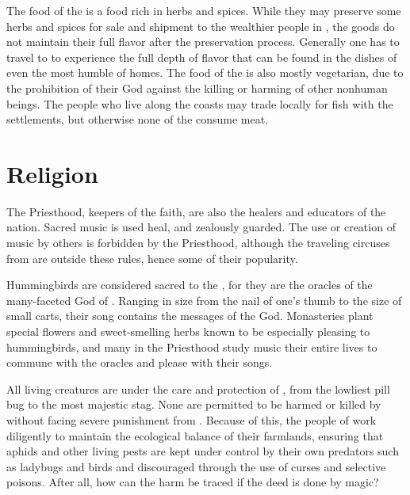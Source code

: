 \documentclass[blue]{GL2020}
\begin{document}
The food of the \pFarm{} is a food rich in herbs and spices.  While they may preserve some herbs and spices for sale and shipment to the wealthier people in \pTech{}, the goods do not maintain their full flavor after the preservation process.  Generally one has to travel to \pFarm{} to experience the full depth of flavor that can be found in the dishes of even the most humble of homes.  The food of the \pFarmers{} is also mostly vegetarian, due to the prohibition of their God against the killing or harming of other nonhuman beings.  The people who live along the coasts may trade locally for fish with the \pShip{} settlements, but otherwise none of the \pFarm{} consume meat.


\section*{Religion}

The Priesthood, keepers of the faith, are also the healers and educators of the nation.  Sacred music is used heal, and zealously guarded.  The use or creation of music by others is forbidden by the Priesthood, although the traveling circuses from \pTech{} are outside these rules, hence some of their popularity.

Hummingbirds are considered sacred to the \pFarmers{}, for they are the oracles of the many-faceted God of \pFarm{}.  Ranging in size from the nail of one's thumb to the size of small carts, their song contains the messages of the God.  Monasteries plant special flowers and sweet-smelling herbs known to be especially pleasing to hummingbirds, and many in the Priesthood study music their entire lives to commune with the oracles and please \cFarmGod{} with their songs.

All living creatures are under the care and protection of \cFarmGod{}, from the lowliest pill bug to the most majestic stag.  None are permitted to be harmed or killed by \pFarm{} without facing severe punishment from \cFarmGod{}.  Because of this, the people of \pFarm{} work diligently to maintain the ecological balance of their farmlands, ensuring that aphids and other living pests are kept under control by their own predators such as ladybugs and birds and discouraged through the use of curses and selective poisons.  After all, how can the harm be traced if the deed is done by magic?  
\end{document}
